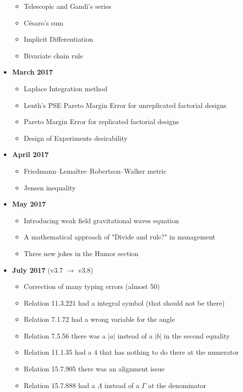 \documentclass[12pt,a4paper,twoside,openright]{report}
\theoremstyle{definition}
\theoremstyle{itexmp}
\numberwithin{equation}{section}
\begin{document}
\begin{itemize}
\begin{itemize}[noitemsep]
			\item Telescopic and Gandi's series
			\item Césaro's sum
			\item Implicit Differentiation
			\item Bivariate chain rule
		\end{itemize}
	\item \textbf{March 2017}
		\begin{itemize}[noitemsep]
			\item Laplace Integration method
			\item Lenth's PSE Pareto Margin Error for unreplicated factorial designs
			\item Pareto Margin Error for replicated factorial designs
			\item Design of Experiments desirability
		\end{itemize}
	\item \textbf{April 2017}
		\begin{itemize}[noitemsep]
			\item Friedmann–Lemaître–Robertson–Walker metric
			\item Jensen inequality
		\end{itemize}
	\item \textbf{May 2017}
		\begin{itemize}[noitemsep]
			\item Introducing weak field gravitational waves equation
			\item A mathematical approach of "Divide and rule?" in management
			\item Three new jokes in the Humor section
		\end{itemize}
	\item \textbf{July 2017} (v3.7 $\rightarrow$ v3.8)
		\begin{itemize}[noitemsep]
			\item Correction of many typing errors (almost 50)
			\item Relation 11.3.221 had a integral symbol  (that should not be there)
			\item Relation 7.1.72 had a wrong variable for the angle
			\item Relation 7.5.56 there was a $|a|$ instead of a $|b|$ in the second equality
			\item Relation 11.1.35 had a $4$ that has nothing to do there at the numerator
			\item Relation 15.7.905 there was an alignment issue
			\item Relation 15.7.888 had a $\Lambda$ instead of a $\Gamma$ at the denominator

\end{itemize}
\end{itemize}
\end{document}
